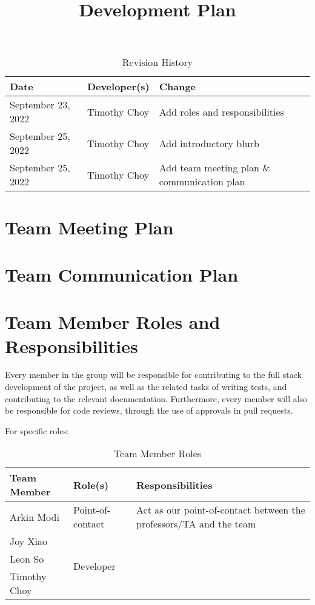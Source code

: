 \documentclass{article}
\title{Development Plan\\\progname}
\author{\authname}
\date{}
\begin{document}
\begin{table}[hp]
\caption{Revision History} \label{TblRevisionHistory}
\begin{tabularx}{\textwidth}{llX}
\toprule
\textbf{Date} & \textbf{Developer(s)} & \textbf{Change}\\
\midrule
September 23, 2022 & Timothy Choy & Add roles and responsibilities\\
September 25, 2022 & Timothy Choy & Add introductory blurb \\
September 25, 2022 & Timothy Choy & Add team meeting plan \& communication plan \\
\bottomrule
\end{tabularx}
\end{table}

\newpage

\maketitle


\section{Team Meeting Plan}

\section{Team Communication Plan}

\section{Team Member Roles and Responsibilities}

Every member in the group will be responsible for contributing to the full stack 
development of the project, as well as the related tasks of writing tests, and 
contributing to the relevant documentation. Furthermore, every member will also 
be responsible for code reviews, through the use of approvals in pull requests. 

For specific roles:
\begin{table}
	\centering
	\caption{Team Member Roles}
	\vspace{5pt}
	\begin{tabular}{l|l|l}
		Team Member & Role(s) & Responsibilities \\ \hline
		Arkin Modi & Point-of-contact & Act as our point-of-contact between the 
		professors/TA and the team \\
		Joy Xiao & \multirow{3}{*}{Developer} & \\
		Leon So & & \\
		Timothy Choy & & \\
	\end{tabular}
\end{table}
\end{document}
